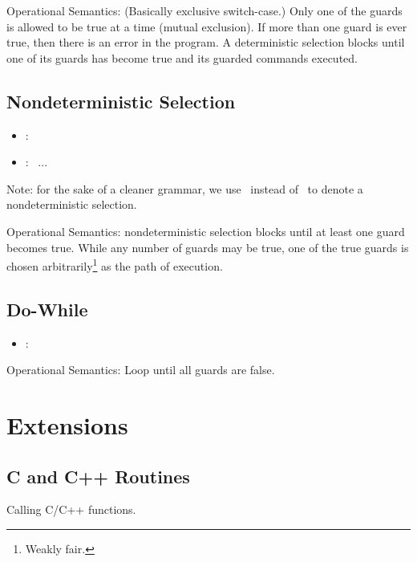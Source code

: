 Operational Semantics: 
(Basically exclusive switch-case.)
Only one of the guards is allowed to be true at a time (mutual exclusion).  
If more than one guard is ever true, then there is an error in the program.  
A deterministic selection blocks until one of its guards has become true
and its guarded commands executed.  


\subsection{Nondeterministic Selection}
\label{sec:chp:flow:nondetsel}

\begin{itemize}
\item {} :
	\lbracket\  \rbracket
\item {} :
	 \thinbar\ ...
\end{itemize}

Note: for the sake of a cleaner grammar, 
we use \thinbar\ instead of \oldthinbar\ to denote 
a nondeterministic selection.  

Operational Semantics: nondeterministic selection blocks until at least
one guard becomes true.  
While any number of guards may be true, one of the true guards is 
chosen arbitrarily\footnote{Weakly fair.} as the path of execution.  


\subsection{Do-While}
\label{sec:chp:flow:dowhile}

\begin{itemize}
\item {} :
	\chpbeginloop\  \chpendloop
\end{itemize}

Operational Semantics:
Loop until all guards are false.  

\section{Extensions}
\label{sec:chp:ext}

\subsection{C and C++ Routines}
\label{sec:chp:ext:c}

Calling C/C++ functions.  

